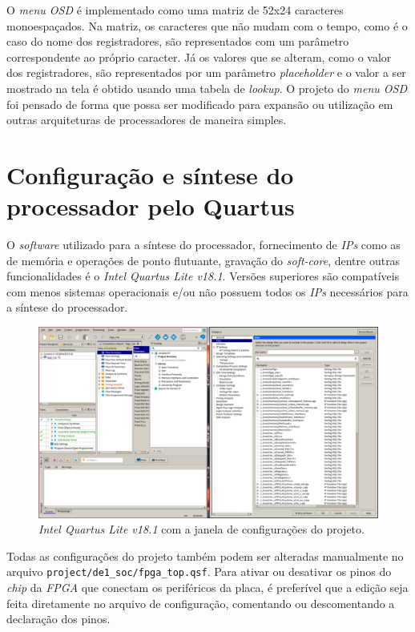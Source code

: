     { O \textit{menu OSD} é implementado como uma matriz de 52x24 caracteres
        monoespaçados. Na matriz, os caracteres que não mudam com o tempo, como
        é o caso do nome dos registradores, são representados com um parâmetro
        correspondente ao próprio caracter. Já os valores que se alteram, como
        o valor dos registradores, são representados por um parâmetro
        \textit{placeholder} e o valor a ser mostrado na tela é obtido usando
        uma tabela de \textit{lookup}. O projeto do \textit{menu OSD} foi pensado
        de forma que possa ser modificado para expansão ou utilização em outras
        arquiteturas de processadores de maneira simples.
    }


    \section{Configuração e síntese do processador pelo Quartus}
    { O \textit{software} utilizado para a síntese do processador, fornecimento
        de \textit{IPs} como as de memória e operações de ponto flutuante,
        gravação do \textit{soft-core}, dentre outras funcionalidades é o
        \textit{Intel Quartus Lite v18.1}. Versões superiores são compatíveis com
        menos sistemas operacionais e/ou não possuem todos os \textit{IPs}
        necessários para a síntese do processador.
    }
    \begin{figure}[H]
    \centering
        \includegraphics[width=.9\linewidth]{../images/quartus/files_config.png}
        \caption{\textit{Intel Quartus Lite v18.1} com a janela de configurações
            do projeto.}\label{fig:quartus_files_config}
    \end{figure}

    { Todas as configurações do projeto também podem ser alteradas manualmente
        no arquivo \texttt{project/de1\_soc/fpga\_top.qsf}. Para ativar ou desativar
        os pinos do \textit{chip} da \textit{FPGA} que conectam os periféricos
        da placa, é preferível que a edição seja feita diretamente no arquivo
        de configuração, comentando ou descomentando a declaração dos pinos.
    }

